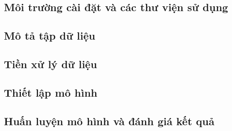 \subsection{Môi trường cài đặt và các thư viện sử dụng}


\subsection{Mô tả tập dữ liệu}


\subsection{Tiền xử lý dữ liệu}


\subsection{Thiết lập mô hình}


\subsection{Huấn luyện mô hình và đánh giá kết quả}
